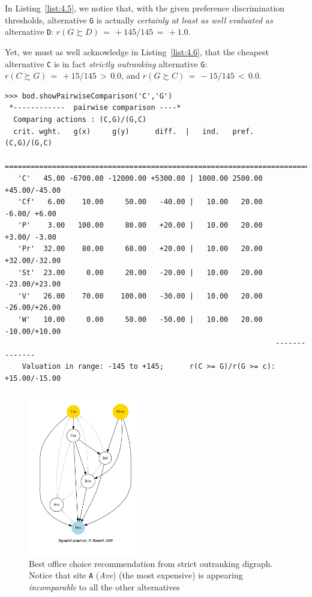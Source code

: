 In Listing~\vref{list:4.5}, we notice that, with the given preference discrimination thresholds, alternative \texttt{G} is actually \emph{certainly at least as well evaluated as} alternative \texttt{D}:  $r(G \succsim D)\, = \, +145/145\, =\, +1.0$.

Yet, we must as well acknowledge in Listing~\vref{list:4.6}, that the cheapest alternative \texttt{C} is in fact \emph{strictly outranking} alternative \texttt{G}:  $r(C \succsim G)\, =\, +15/145\, >\, 0.0$, and $r(G \succsim C)\, =\, -15/145 \,<\, 0.0$.
\begin{lstlisting}[caption={Inspecting pairwise comparison between alternatives \texttt{C} and \texttt{G}},label=list:4.6,basicstyle=\ttfamily\scriptsize]
>>> bod.showPairwiseComparison('C','G')
 *------------  pairwise comparison ----*
  Comparing actions : (C,G)/(G,C)
  crit. wght.   g(x)     g(y)      diff.  |   ind.   pref.       (C,G)/(G,C)
   ==========================================================================
   'C'   45.00 -6700.00 -12000.00 +5300.00 | 1000.00 2500.00    +45.00/-45.00 
   'Cf'   6.00    10.00     50.00   -40.00 |   10.00   20.00     -6.00/ +6.00 
   'P'    3.00   100.00     80.00   +20.00 |   10.00   20.00     +3.00/ -3.00 
   'Pr'  32.00    80.00     60.00   +20.00 |   10.00   20.00    +32.00/-32.00 
   'St'  23.00     0.00     20.00   -20.00 |   10.00   20.00    -23.00/+23.00 
   'V'   26.00    70.00    100.00   -30.00 |   10.00   20.00    -26.00/+26.00 
   'W'   10.00     0.00     50.00   -50.00 |   10.00   20.00    -10.00/+10.00
                                                               --------------
    Valuation in range: -145 to +145;      r(C >= G)/r(G >= c): +15.00/-15.00
\end{lstlisting}
\begin{figure}[ht]
\sidecaption[t]
\includegraphics[width=5cm]{Figures/4-3-bestOfficeChoice.pdf}
\caption{Best office choice recommendation from strict outranking digraph. Notice that site \texttt{A} (\emph{Ave}) (the most expensive) is appearing \emph{incomparable} to all the other alternatives}
\label{fig:4.3}       %
\end{figure}

